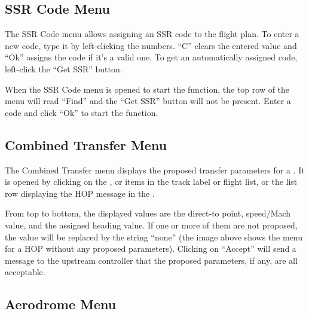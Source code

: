\documentclass[a4paper,oneside,11pt]{memoir}
\begin{document}
\subsection{SSR Code Menu}\label{menu:assr}


The SSR Code menu allows assigning an SSR code to the flight plan. To enter a new code, type it by left-clicking the numbers. “C” clears the entered value and “Ok” assigns the code if it’s a valid one. To get an automatically assigned code, left-click the “Get SSR” button.

%
%

\bigskip

When the SSR Code menu is opened to start the  function, the top row of the menu will read “Find” and the “Get SSR” button will not be present. Enter a code and click “Ok” to start the function.

\subsection{Combined Transfer Menu}
\label{menu:ctm}

The Combined Transfer menu displays the proposed transfer parameters for a . It is opened by clicking on the ,  or  items in the track label or flight list, or the list row displaying the HOP message in the .

\bigskip

From top to bottom, the displayed values are the direct-to point, speed/Mach value, and the assigned heading value. If one or more of them are not proposed, the value will be replaced by the string “none” (the image above shows the menu for a HOP without any proposed parameters). Clicking on “Accept” will send a message to the upstream controller that the proposed parameters, if any, are all acceptable.

\subsection{Aerodrome Menu}
\label{menu:ad}
\end{document}
